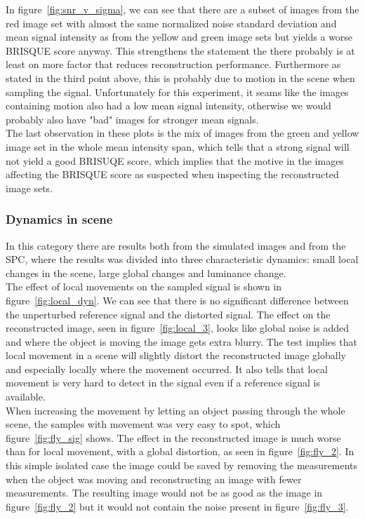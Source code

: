 In figure~\ref{fig:snr_v_sigma}, we can see that there are a subset of images from the red image set with almost the same normalized noise standard deviation and mean signal intensity as from the yellow and green image sets but yields a worse BRISQUE score anyway. This strengthens the statement the there probably is at least on more factor that reduces reconstruction performance. Furthermore as stated in the third point above, this is probably due to motion in the scene when sampling the signal. Unfortunately for this experiment, it seams like the images containing motion also had a low mean signal intensity, otherwise we would probably also have "bad" images for stronger mean signals.\\[0.1in] 

The last observation in these plots is the mix of images from the green and yellow image set in the whole mean intensity span, which tells that a strong signal will not yield a good BRISUQE score, which implies that the motive in the images affecting the BRISQUE score as suspected when inspecting the reconstructed image sets.

\subsubsection{Dynamics in scene}
In this category there are results both from the simulated images and from the SPC, where the results was divided into three characteristic dynamics: small local changes in the scene, large global changes and luminance change.\\[0.1in]

The effect of local movements on the sampled signal is shown in figure~\ref{fig:local_dyn}. We can see that there is no significant difference between the unperturbed reference signal and the distorted signal. The effect on the reconstructed image, seen in figure~\ref{fig:local_3}, looks like global noise is added and where the object is moving the image gets extra blurry. The test implies that local movement in a scene will slightly distort the reconstructed image globally and especially locally where the movement occurred. It also tells that local movement is very hard to detect in the signal even if a reference signal is available.\\[0.1in]

When increasing the movement by letting an object passing through the whole scene, the samples with movement was very easy to spot, which figure~\ref{fig:fly_sig} shows. The effect in the reconstructed image is much worse than for local movement, with a global distortion, as seen in figure~\ref{fig:fly_2}. In this simple isolated case the image could be saved by removing the measurements when the object was moving and reconstructing an image with fewer measurements. The resulting image would not be as good as the image in figure~\ref{fig:fly_2} but it would not contain the noise present in figure~\ref{fig:fly_3}. \\[0.1in]


